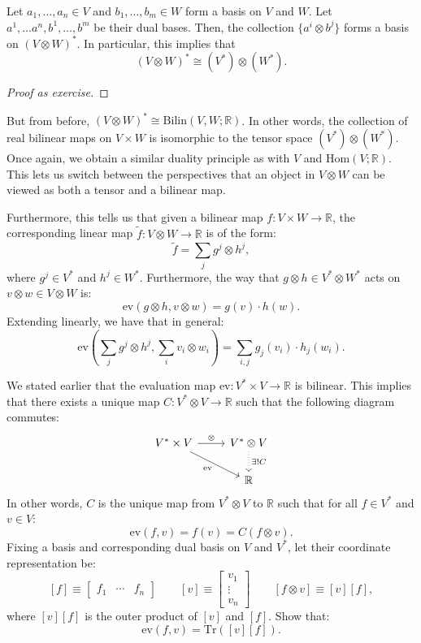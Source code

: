 \begin{proposition}
  Let $a_1,\dotsc, a_n \in V$ and $b_1, \dotsc, b_m \in W$ form a basis on $V$ and $W$. Let $a^1,\dotsc a^n, b^1,\dotsc, b^m$ be their dual bases. Then, the collection $\{a^i \otimes b^j\}$ forms a basis on $(V \otimes W)^*$. In particular, this implies that \[(V \otimes W)^* \cong (V^*) \otimes (W^*).\]
\end{proposition}
\begin{proof}[Proof as exercise]
\end{proof}

But from before, $(V \otimes W)^* \cong \mathrm{Bilin}(V,W; \mathbb{R})$. In other words, the collection of real bilinear maps on $V \times W$ is isomorphic to the tensor space $(V^*) \otimes (W^*)$. Once again, we obtain a similar duality principle as with $V$ and $\mathrm{Hom}(V;\mathbb{R})$. This lets us switch between the perspectives that an object in $V \otimes W$ can be viewed as both a tensor and a bilinear map.

Furthermore, this tells us that given a bilinear map $f: V \times W \to \mathbb{R}$, the corresponding linear map $\tilde{f}: V \otimes W \to \mathbb{R}$ is of the form:
\[\tilde{f} = \sum_{j} g^j \otimes h^j,\]
where $g^j \in V^*$ and $h^j \in W^*$. Furthermore, the way that $g \otimes h \in V^* \otimes W^*$ acts on $v \otimes w \in V\otimes W$ is:
\[\mathrm{ev}(g \otimes h, v \otimes w) = g(v) \cdot h(w).\]
Extending linearly, we have that in general:
\[\mathrm{ev}\left(\sum_{j} g^j \otimes h^j, \sum_i v_i \otimes w_i\right) = \sum_{i,j} g_j(v_i) \cdot h_j(w_i).\]

\begin{exercise} We stated earlier that the evaluation map $\mathrm{ev}: V^* \times V \to \mathbb{R}$ is bilinear. This implies that there exists a unique map $C: V^* \otimes V \to \mathbb{R}$ such that the following diagram commutes:
\[\begin{tikzcd}
V^*\times V \arrow{r}{\otimes } \arrow[swap]{dr}{\mathrm{ev}} & V^* \otimes V \arrow[dotted]{d}{\exists !C} \\
& \mathbb{R}
\end{tikzcd}\]
In other words, $C$ is the unique map from $V^* \otimes V$ to $\mathbb{R}$ such that for all $f \in V^*$ and $v \in V$:
\[\mathrm{ev}(f, v) = f(v) = C(f \otimes v).\]
Fixing a basis and corresponding dual basis on $V$ and $V^*$, let their coordinate representation be:
\[[f] \equiv \begin{bmatrix} f_1 & \dotsm & f_n \end{bmatrix}\quad\quad [v] \equiv \begin{bmatrix} v_1 \\ \vdots \\ v_n \end{bmatrix}\quad\quad [f \otimes v] \equiv [v][f],\]
where $[v][f]$ is the outer product of $[v]$ and $[f]$. Show that:
\[\mathrm{ev}(f,v) = \mathrm{Tr}\left([v][f]\right).\]
\end{exercise}

